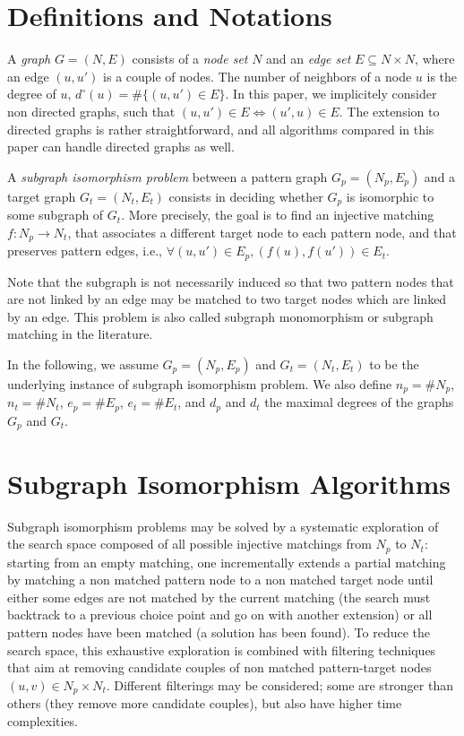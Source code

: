 \documentclass{llncs}
\begin{document}
\section{Definitions and Notations}

A \emph{graph} $G=(N,E)$ consists of a \emph{node set} $N$ and an \emph{edge set} $E \subseteq N \times N$, where an edge $(u,u')$ is a couple of nodes. The number of neighbors of a node $u$ is the degree of $u$, $d^\circ(u)=\#\{ (u,u')\in E\}$. In this paper, we implicitely consider non directed graphs, such that $(u,u')\in E\Leftrightarrow (u',u)\in E$. The extension to directed graphs is rather straightforward, and all algorithms compared in this paper can handle directed graphs as well.
   
A \emph{subgraph isomorphism problem} between a pattern graph $G_p=(N_p,E_p)$ and a target graph $G_t=(N_t,E_t)$ consists in deciding whether $G_p$ is isomorphic to some subgraph of $G_t$. More precisely, the goal is to find an injective matching $f: N_p\rightarrow N_t$, that associates a different target node to each pattern node, and that preserves pattern edges, i.e., $\forall (u,u') \in E_p, (f(u),f(u')) \in E_t$.

Note that the subgraph is not necessarily induced so that two pattern nodes that are not linked by an edge may be matched to two target nodes which are linked by an edge. This problem is also called subgraph monomorphism or subgraph matching in the literature. 

In the following, we assume $G_p=(N_p,E_p)$ and $G_t=(N_t,E_t)$ to be the underlying instance of subgraph isomorphism problem. 
We also define $n_p = \# N_p$, $n_t = \# N_t$,  $e_p=\# E_p$, $e_t=\# E_t$, and $d_p$ and $d_t$ the maximal degrees of the graphs $G_p$ and $G_t$. 


\section{Subgraph Isomorphism Algorithms}

Subgraph isomorphism problems may be solved by a systematic exploration of the search space composed of all possible injective matchings from $N_p$ to $N_t$: starting from an empty matching, one incrementally extends a partial matching by matching a non matched pattern node to a non matched target node until either some edges are not matched by the current matching (the search must backtrack to a previous choice point and go on with another extension) or all pattern nodes have been matched (a solution has been found). To reduce the search space, this exhaustive exploration is combined with filtering techniques that aim at removing candidate couples of non matched pattern-target nodes $(u,v)\in N_p\times N_t$. Different filterings may be considered; some are stronger than others (they remove more candidate couples), but also have higher time complexities.
\end{document}

